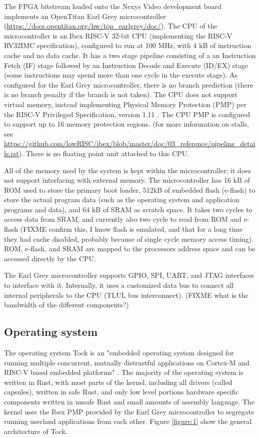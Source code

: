 \documentclass{article}
\begin{document}
The FPGA bitstream loaded onto the Nexys Video development board implements an OpenTitan Earl Grey microcontroller (\url{https://docs.opentitan.org/hw/top_earlgrey/doc/}). The CPU of the microcontroller is an Ibex RISC-V 32-bit CPU (implementing the RISC-V RV32IMC specification), configured to run at 100 MHz, with 4 kB of instruction cache and no data cache. It has a two stage pipeline consisting of a an Instruction Fetch (IF) stage followed by an Instruction Decode and Execute (ID/EX) stage (some instructions may spend more than one cycle in the execute stage). As configured for the Earl Grey microcontroller, there is no branch prediction (there is no branch penalty if the branch is not taken). The CPU does not support virtual memory, instead implementing Physical Memory Protection (PMP) per the RISC-V Privileged Specification, version 1.11 \cite{riscv-priv}. The CPU PMP is configured to support up to 16 memory protection regions. (for more information on stalls, see \url{https://github.com/lowRISC/ibex/blob/master/doc/03\_reference/pipeline\_details.rst}). There is no floating point unit attached to this CPU.

All of the memory used by the system is kept within the microcontroller; it does not support interfacing with external memory. The microcontroller has 16 kB of ROM used to store the primary boot loader, 512kB of embedded flash (e-flash) to store the actual program data (such as the operating system and application programs and data), and 64 kB of SRAM as scratch space. It takes two cycles to access data from SRAM, and currently also two cycle to read from ROM and e-flash (FIXME confirm this, I know flash is emulated, and that for a long time they had cache disabled, probably because of single cycle memory access timing). ROM, e-flash, and SRAM are mapped to the processors address space and can be accessed directly by the CPU.

The Earl Grey microcontroller supports GPIO, SPI, UART, and JTAG interfaces to interface with it. Internally, it uses a customized data bus to connect all internal peripherals to the CPU (TLUL bus interconnect). (FIXME what is the bandwidth of the different components?)

\subsection{Operating system}

The operating system Tock is an "embedded operating system designed for running multiple concurrent, mutually distrustful applications on Cortex-M and RISC-V based embedded platforms" \cite{tockgithub}. The majority of the operating system is written in Rust, with most parts of the kernel, including all drivers (called capsules), written in safe Rust, and only low level portions hardware specific components written in unsafe Rust and small amounts of assembly language. The kernel uses the Ibex PMP provided by the Earl Grey microcontroller to segregate running userland applications from each other. Figure \ref{figure:1} show the general architecture of Tock.
\end{document}
